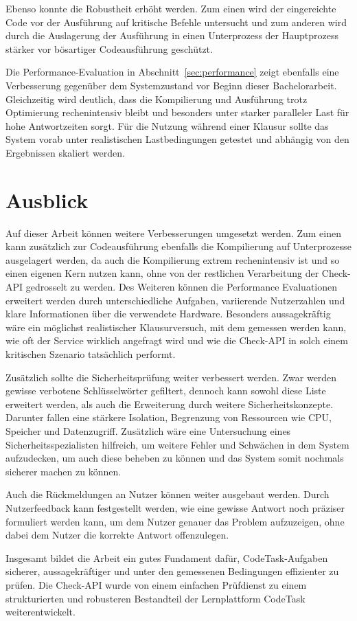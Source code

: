 Ebenso konnte die Robustheit erhöht werden. Zum einen wird der eingereichte Code vor der Ausführung auf kritische Befehle untersucht und zum anderen wird durch die Auslagerung der Ausführung in einen Unterprozess der Hauptprozess stärker vor bösartiger Codeausführung geschützt.

Die Performance-Evaluation in Abschnitt~\ref{sec:performance} zeigt ebenfalls eine Verbesserung gegenüber dem Systemzustand vor Beginn dieser Bachelorarbeit. Gleichzeitig wird deutlich, dass die Kompilierung und Ausführung trotz Optimierung rechenintensiv bleibt und besonders unter starker paralleler Last für hohe Antwortzeiten sorgt. Für die Nutzung während einer Klausur sollte das System vorab unter realistischen Lastbedingungen getestet und abhängig von den Ergebnissen skaliert werden.

\section{Ausblick}
Auf dieser Arbeit können weitere Verbesserungen umgesetzt werden. Zum einen kann zusätzlich zur Codeausführung ebenfalls die Kompilierung auf Unterprozesse ausgelagert werden, da auch die Kompilierung extrem rechenintensiv ist und so einen eigenen Kern nutzen kann, ohne von der restlichen Verarbeitung der Check-API gedrosselt zu werden. Des Weiteren können die Performance Evaluationen erweitert werden durch unterschiedliche Aufgaben, variierende Nutzerzahlen und klare Informationen über die verwendete Hardware. Besonders aussagekräftig wäre ein möglichst realistischer Klausurversuch, mit dem gemessen werden kann, wie oft der Service wirklich angefragt wird und wie die Check-API in solch einem kritischen Szenario tatsächlich performt.

Zusätzlich sollte die Sicherheitsprüfung weiter verbessert werden. Zwar werden gewisse verbotene Schlüsselwörter gefiltert, dennoch kann sowohl diese Liste erweitert werden, als auch die Erweiterung durch weitere Sicherheitskonzepte. Darunter fallen eine stärkere Isolation, Begrenzung von Ressourcen wie CPU, Speicher und Datenzugriff. Zusätzlich wäre eine Untersuchung eines Sicherheitsspezialisten hilfreich, um weitere Fehler und Schwächen in dem System aufzudecken, um auch diese beheben zu können und das System somit nochmals sicherer machen zu können.

Auch die Rückmeldungen an Nutzer können weiter ausgebaut werden. Durch Nutzerfeedback kann festgestellt werden, wie eine gewisse Antwort noch präziser formuliert werden kann, um dem Nutzer genauer das Problem aufzuzeigen, ohne dabei dem Nutzer die korrekte Antwort offenzulegen.

Insgesamt bildet die Arbeit ein gutes Fundament dafür, CodeTask-Aufgaben sicherer, aussagekräftiger und unter den gemessenen Bedingungen effizienter zu prüfen. Die Check-API wurde von einem einfachen Prüfdienst zu einem strukturierten und robusteren Bestandteil der Lernplattform CodeTask weiterentwickelt.
